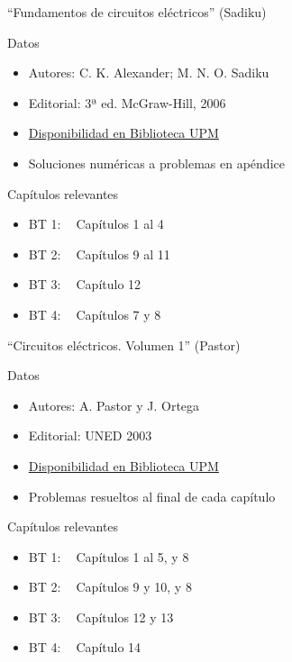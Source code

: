 \documentclass[aspectratio=169, usenames,svgnames,dvipsnames]{beamer}
\begin{document}
\begin{frame}{``Fundamentos de circuitos eléctricos'' (\alert{Sadiku})}
    \begin{block}{Datos}
        \begin{itemize}
        \item Autores: C. K. Alexander; M. N. O. Sadiku
        \item Editorial: 3ª ed. McGraw-Hill, 2006
        \item \href{https://ingenio.upm.es/primo-explore/fulldisplay?docid=34UPM\_ALMA2164599810004212\&context=L\&vid=34UPM\_VU1\&search\_scope=TAB1\_SCOPE1\&isFrbr=true\&tab=tab1\&lang=es\_ES}{Disponibilidad en Biblioteca UPM}
        \item Soluciones numéricas a problemas en apéndice
        \end{itemize}
    \end{block}
    
    \begin{block}{Capítulos relevantes}
        \begin{itemize}
        \item BT 1: $\;\;$ Capítulos 1 al 4
        \item BT 2: $\;\;$ Capítulos 9 al 11
        \item BT 3: $\;\;$ Capítulo 12
        \item BT 4: $\;\;$ Capítulos 7 y 8
        \end{itemize}
        \end{block}
\end{frame}


\begin{frame}{``Circuitos eléctricos. Volumen 1'' (\alert{Pastor})}
    \begin{block}{Datos}
        \begin{itemize}
        \item Autores: A. Pastor y J. Ortega
        \item Editorial: UNED 2003
        \item \href{https://ingenio.upm.es/primo-explore/fulldisplay?docid=34UPM\_ALMA2148217180004212\&context=L\&vid=34UPM\_VU1\&search\_scope=TAB1\_SCOPE1\&tab=tab1\&lang=es\_ES}{Disponibilidad en Biblioteca UPM}
        \item Problemas resueltos al final de cada capítulo
        \end{itemize}
    \end{block}
    
    \begin{block}{Capítulos relevantes}
        \begin{itemize}
        \item BT 1: $\;\;$ Capítulos 1 al 5, y 8
        \item BT 2: $\;\;$ Capítulos 9 y 10, y 8
        \item BT 3: $\;\;$ Capítulos 12 y 13
        \item BT 4: $\;\;$ Capítulo 14
        \end{itemize}
    \end{block}
\end{frame}
\end{document}

